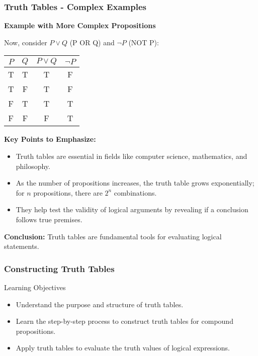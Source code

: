 \documentclass[aspectratio=169]{beamer}
\begin{document}
\begin{frame}[fragile]
  \frametitle{Truth Tables - Complex Examples}
  \textbf{Example with More Complex Propositions}
  
  Now, consider \( P \lor Q \) (P OR Q) and \( \neg P \) (NOT P):
  
  \begin{table}[h]
    \centering
    \begin{tabular}{|c|c|c|c|}
      \hline
      $P$ & $Q$ & $P \lor Q$ & $\neg P$ \\
      \hline
      T & T & T & F \\
      T & F & T & F \\
      F & T & T & T \\
      F & F & F & T \\
      \hline
    \end{tabular}
  \end{table}
  
  \textbf{Key Points to Emphasize:}
  \begin{itemize}
    \item Truth tables are essential in fields like computer science, mathematics, and philosophy.
    \item As the number of propositions increases, the truth table grows exponentially; for \( n \) propositions, there are \( 2^n \) combinations.
    \item They help test the validity of logical arguments by revealing if a conclusion follows true premises.
  \end{itemize}
  
  \textbf{Conclusion:} Truth tables are fundamental tools for evaluating logical statements.
\end{frame}

\begin{frame}[fragile]
    \frametitle{Constructing Truth Tables}
    \begin{block}{Learning Objectives}
        \begin{itemize}
            \item Understand the purpose and structure of truth tables.
            \item Learn the step-by-step process to construct truth tables for compound propositions.
            \item Apply truth tables to evaluate the truth values of logical expressions.
        \end{itemize}
    \end{block}
\end{frame}
\end{document}
